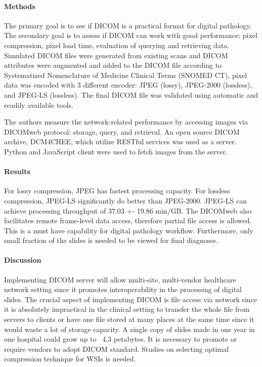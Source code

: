 \documentclass{article}
\begin{document}
\paragraph{Methods}
The primary goal is to see if DICOM is a practical format for digital pathology. The secondary goal is to assess if DICOM can work with good performance: pixel compression, pixel load time, evaluation of querying and retrieving data. Simulated DICOM files were generated from existing scans and DICOM attributes were augmented and added to the DICOM file according to Systematized Nomenclature of Medicine Clinical Terms (SNOMED CT), pixel data was encoded with 3 different encoder: JPEG (lossy), JPEG-2000 (lossless), and JPEG-LS (lossless). The final DICOM file was validated using automatic and readily available tools. 

The authors measure the network-related performance by accessing images via DICOMweb protocol: storage,  query, and retrieval. An open source DICOM archive, DCM4CHEE, which utilize RESTful services was used as a server. Python and JavaScript client were used to fetch images from the server. 

\paragraph{Results} 
For lossy compression, JPEG has fastest processing capacity. For lossless compression, JPEG-LS significantly do better than JPEG-2000. JPEG-LS can achieve processing throughput of 37.03 +- 19.86 min/GB. The DICOMweb also facilitates remote frame-level data access, therefore partial file access is allowed. This is a must have capability for digital pathology workflow. Furthermore, only small fraction of the slides is needed to be viewed for final diagnoses. 

\paragraph{Discussion}
Implementing DICOM server will allow multi-site, multi-vendor healthcare network setting since it promotes interoperability in the processing of digital slides. The crucial aspect of implementing DICOM is file access via network since it is absolutely impractical in the clinical setting to transfer the whole file from servers to clients or have one file stored at many places at the same time since it would waste a lot of storage capacity. A single copy of slides made in one year in one hospital could grow up to ~4.3 petabytes. It is necessary to promote or require vendors to adopt DICOM standard. Studies on selecting optimal compression technique for WSIs is needed. 
\end{document}

